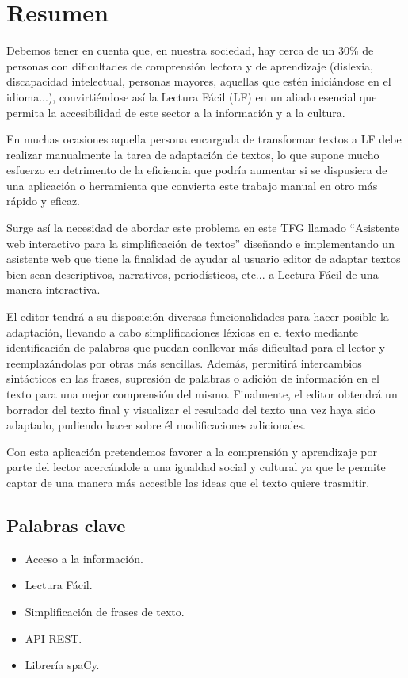 \chapter*{Resumen}

Debemos tener en cuenta que, en nuestra sociedad, hay cerca de un 30\% de personas con dificultades de comprensión lectora y de aprendizaje (dislexia, discapacidad intelectual, personas mayores, aquellas que estén iniciándose en el idioma...), convirtiéndose así la Lectura Fácil (LF) en un aliado esencial que permita la accesibilidad de este sector a la información y a la cultura. 

 \setlength{\parskip}{10pt}

En muchas ocasiones aquella persona encargada de transformar textos a LF debe realizar manualmente la tarea de adaptación de textos, lo que supone mucho esfuerzo en detrimento de la eficiencia que podría aumentar si se dispusiera de una aplicación o herramienta que convierta este trabajo manual en otro más rápido y eficaz.

 \setlength{\parskip}{10pt}

Surge así la necesidad de abordar este problema en este TFG llamado ``Asistente web interactivo para la simplificación de textos'' diseñando e implementando un asistente web que tiene la finalidad de ayudar al usuario editor de adaptar textos  bien sean descriptivos, narrativos, periodísticos, etc... a Lectura Fácil de una manera interactiva. 

 \setlength{\parskip}{10pt}

El editor tendrá a su disposición diversas funcionalidades para hacer posible la adaptación, llevando a cabo simplificaciones léxicas en el texto mediante identificación de palabras que puedan conllevar más dificultad para el lector y reemplazándolas por otras más sencillas. Además, permitirá intercambios sintácticos en las frases, supresión de palabras o adición de información en el texto para una mejor comprensión del mismo. Finalmente, el editor obtendrá un borrador del texto final y visualizar el resultado del texto una vez haya sido adaptado, pudiendo hacer sobre él modificaciones adicionales.

 \setlength{\parskip}{10pt}

Con esta aplicación pretendemos favorer a la comprensión y aprendizaje por parte del lector acercándole a una igualdad social y cultural ya que le permite captar de una manera más accesible las ideas que el texto quiere trasmitir.



\section*{Palabras clave}
   
\begin{itemize}
   	\item Acceso a la información.
   	\item Lectura Fácil.
   	\item Simplificación de frases de texto.
   	\item API REST.
   	\item Librería spaCy.
\end{itemize}
   



